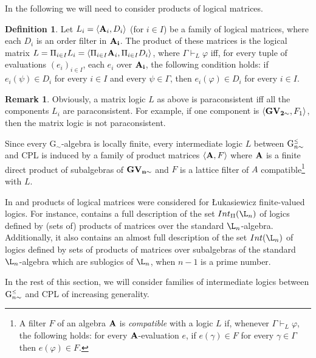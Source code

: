 \documentclass{article}
\theoremstyle{definition}
\newtheorem{definition}{Definition}
\newtheorem{remark}{Remark}
\newcommand{\Gnsimleq}{\mathrm{G}\mystrut^{\text{\tiny $\leq$}}_{n\sim}}
\newcommand\mystrut{\rule{0pt}{7pt}}
\begin{document}
In the following we will need to consider products of logical matrices.

\begin{definition} \label{prodmat}
Let $L_i=\langle {\bf A}_i, D_i \rangle$ (for $i \in I$) be a family of logical matrices, where each $D_i$ is an order filter in ${\bf A_i}$. The product of these matrices
  is the logical matrix $L=\Pi_{i \in I} L_i=\langle \Pi_{i \in I}{\bf A}_i, \Pi_{i \in I}D_i \rangle$, where $\Gamma \vdash_L \varphi$ iff, for every tuple of evaluations $(e_i)_{i \in I}$, each $e_i$ over ${\bf A_i}$, the following condition holds: if $e_i(\psi) \in D_i$ for every $i \in I$ and every $\psi \in \Gamma$, then $e_i(\varphi) \in D_i$ for every $i \in I$.
\end{definition}



\begin{remark}
Obviously, a matrix logic $L$ as above is paraconsistent iff all the components $L_i$ are paraconsistent. For example, if one component is $\langle {\bf GV_{2 \sim}}, F_1\rangle$, then the matrix logic is not paraconsistent.
\end{remark}




Since every G$_{\sim}$-algebra is locally finite, every intermediate logic $L$ between $\Gnsimleq$ and CPL  is induced by a family  of product matrices $\langle {\bf A},F\rangle$ where $\bf A$ is a finite direct product of subalgebras of $\bf GV_{n \sim}$ and $F$ is a lattice filter of $A$ compatible\footnote{A filter $F$ of an algebra $\bf A$ is {\em compatible} with a logic $L$ if, whenever $\Gamma \vdash_L \varphi$, the following holds: for every  $\bf A$-evaluation $e$, if $e(\gamma) \in F$ for every $\gamma \in \Gamma$ then $e(\varphi) \in F$.} with $L$.

In \cite{CoEsGo} and \cite{CoEsGiGo} products of logical  matrices were considered for {\L}ukasiewicz finite-valued logics. For instance, \cite{CoEsGo} contains a full description of the set $Int_\Pi(\L_n)$ of logics defined by (sets of) products of matrices over the standard $\L_n$-algebra. Additionally, it also contains an almost full description of the set $Int(\L_n)$ of logics defined by sets of products of matrices over subalgebras of the standard $\L_n$-algebra which are sublogics of $\L_n$,  when $n-1$ is a prime number.

In the rest of this section, we will consider families of intermediate logics  between  $\Gnsimleq$ and CPL of increasing generality. 
\end{document}
